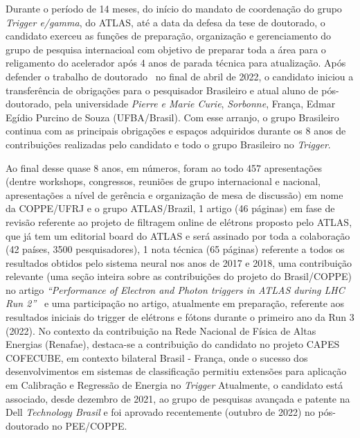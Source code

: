 Durante o período de 14 meses, do início do mandato de coordenação do grupo \emph{Trigger e/gamma}, do ATLAS, até 
a data da defesa da tese de doutorado, o candidato exerceu as funções de preparação, organização 
e gerenciamento do grupo de pesquisa internacioal com objetivo de preparar toda a área para o religamento do 
acelerador após 4 anos de parada técnica para atualização. Após defender o trabalho de doutorado~\cite{tese_joao} no 
final de abril de 2022, o candidato iniciou a transferência de obrigações para o pesquisador Brasileiro e 
atual aluno de pós-doutorado, pela universidade \emph{Pierre e Marie Curie}, \emph{Sorbonne}, França, Edmar Egídio 
Purcino de Souza (UFBA/Brasil). Com esse arranjo, o grupo Brasileiro continua com as principais obrigações 
e espaços adquiridos durante os 8 anos de contribuições realizadas pelo candidato e todo o grupo 
Brasileiro no \emph{Trigger}. 


Ao final desse quase 8 anos, em números, foram ao todo 457 apresentações (dentre workshops, congressos, reuniões 
de grupo internacional e nacional, apresentações a nível de gerência e organização de mesa de discussão) em 
nome da COPPE/UFRJ e o grupo ATLAS/Brazil, 1 artigo (46 páginas) em fase de revisão referente ao projeto de 
filtragem online de elétrons proposto pelo ATLAS, que já tem um editorial board do ATLAS e será assinado 
por toda a colaboração (42 países, 3500 pesquisadores), 1 nota técnica (65 páginas) referente a todos os 
resultados obtidos pelo sistema neural nos anos de 2017 e 2018, uma contribuição relevante (uma seção inteira 
sobre as contribuições do projeto do Brasil/COPPE) no artigo \emph{“Performance of Electron and Photon triggers 
in ATLAS during LHC Run 2”}~\cite{paper_egamma_run2} e uma participação no artigo, atualmente em 
preparação, referente aos resultados 
iniciais do trigger de elétrons e fótons durante o primeiro ano da Run 3 (2022). 
No contexto da contribuição na Rede Nacional de Física de Altas Energias (Renafae), destaca-se a contribuição
do candidato no projeto CAPES COFECUBE, em contexto bilateral Brasil - França, onde o sucesso dos 
desenvolvimentos em sistemas de classificação permitiu extensões para aplicação em Calibração e 
Regressão de Energia no \emph{Trigger}
Atualmente, o candidato está 
associado, desde dezembro de 2021, ao grupo de pesquisas avançada e patente na Dell \emph{Technology Brasil} e foi 
aprovado recentemente (outubro de 2022) no pós-doutorado no PEE/COPPE.



